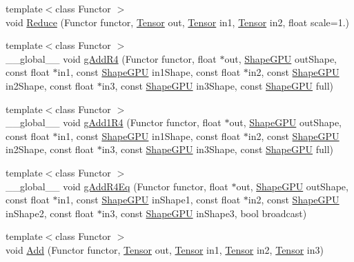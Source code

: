 \begin{DoxyCompactItemize}
\item 
{\footnotesize template$<$class Functor $>$ }\\void \hyperlink{namespacemarian_a175b569d0c1b2c89409b964305bbb426}{Reduce} (Functor functor, \hyperlink{namespacemarian_a88b71ec34bb354564cddc24eb80f7e14}{Tensor} out, \hyperlink{namespacemarian_a88b71ec34bb354564cddc24eb80f7e14}{Tensor} in1, \hyperlink{namespacemarian_a88b71ec34bb354564cddc24eb80f7e14}{Tensor} in2, float scale=1.)
\item 
{\footnotesize template$<$class Functor $>$ }\\\+\_\+\+\_\+global\+\_\+\+\_\+ void \hyperlink{namespacemarian_a07c7c2280aabd4e48cdba0d2cf4a917d}{g\+Add\+R4} (Functor functor, float $\ast$out, \hyperlink{structmarian_1_1ShapeGPU}{Shape\+G\+PU} out\+Shape, const float $\ast$in1, const \hyperlink{structmarian_1_1ShapeGPU}{Shape\+G\+PU} in1\+Shape, const float $\ast$in2, const \hyperlink{structmarian_1_1ShapeGPU}{Shape\+G\+PU} in2\+Shape, const float $\ast$in3, const \hyperlink{structmarian_1_1ShapeGPU}{Shape\+G\+PU} in3\+Shape, const \hyperlink{structmarian_1_1ShapeGPU}{Shape\+G\+PU} full)
\item 
{\footnotesize template$<$class Functor $>$ }\\\+\_\+\+\_\+global\+\_\+\+\_\+ void \hyperlink{namespacemarian_a7caa3e7e7bc68c5174a625bd23f2ff8d}{g\+Add1\+R4} (Functor functor, float $\ast$out, \hyperlink{structmarian_1_1ShapeGPU}{Shape\+G\+PU} out\+Shape, const float $\ast$in1, const \hyperlink{structmarian_1_1ShapeGPU}{Shape\+G\+PU} in1\+Shape, const float $\ast$in2, const \hyperlink{structmarian_1_1ShapeGPU}{Shape\+G\+PU} in2\+Shape, const float $\ast$in3, const \hyperlink{structmarian_1_1ShapeGPU}{Shape\+G\+PU} in3\+Shape, const \hyperlink{structmarian_1_1ShapeGPU}{Shape\+G\+PU} full)
\item 
{\footnotesize template$<$class Functor $>$ }\\\+\_\+\+\_\+global\+\_\+\+\_\+ void \hyperlink{namespacemarian_a5b77f356db43dd0f5ca6eeb10b3ed27b}{g\+Add\+R4\+Eq} (Functor functor, float $\ast$out, \hyperlink{structmarian_1_1ShapeGPU}{Shape\+G\+PU} out\+Shape, const float $\ast$in1, const \hyperlink{structmarian_1_1ShapeGPU}{Shape\+G\+PU} in\+Shape1, const float $\ast$in2, const \hyperlink{structmarian_1_1ShapeGPU}{Shape\+G\+PU} in\+Shape2, const float $\ast$in3, const \hyperlink{structmarian_1_1ShapeGPU}{Shape\+G\+PU} in\+Shape3, bool broadcast)
\item 
{\footnotesize template$<$class Functor $>$ }\\void \hyperlink{namespacemarian_afc796f7741733c0887737b61ad6da946}{Add} (Functor functor, \hyperlink{namespacemarian_a88b71ec34bb354564cddc24eb80f7e14}{Tensor} out, \hyperlink{namespacemarian_a88b71ec34bb354564cddc24eb80f7e14}{Tensor} in1, \hyperlink{namespacemarian_a88b71ec34bb354564cddc24eb80f7e14}{Tensor} in2, \hyperlink{namespacemarian_a88b71ec34bb354564cddc24eb80f7e14}{Tensor} in3)

\end{DoxyCompactItemize}
